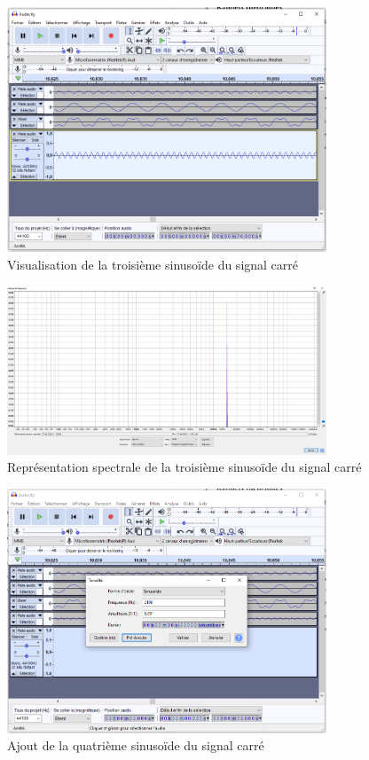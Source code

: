 \documentclass[a4paper]{article}
\begin{document}
\begin{figure}[H]
    \centering
    \includegraphics[width=0.85\textwidth]{images/SignalCarre013.PNG}
    \caption{Visualisation de la troisième sinusoïde du signal carré}
    \label{fig:SignalCarre013}
\end{figure}

\begin{figure}[H]
    \centering
    \includegraphics[width=0.85\textwidth]{images/SignalCarre023.PNG}
    \caption{Représentation spectrale de la troisième sinusoïde du signal carré}
    \label{fig:SignalCarre023}
\end{figure}


\begin{figure}[H]
    \centering
    \includegraphics[width=0.85\textwidth]{images/SignalCarre015.PNG}
    \caption{Ajout de la quatrième sinusoïde du signal carré}
    \label{fig:SignalCarre015}
\end{figure}
\end{document}
